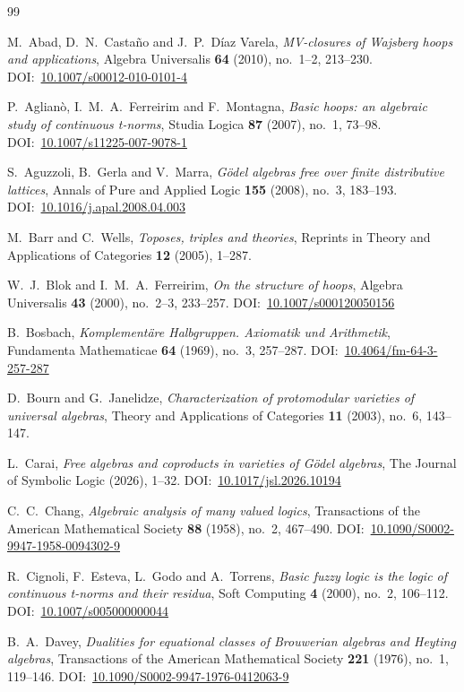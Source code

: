 \documentclass[reqno,a4paper]{amsart}
\renewcommand{\doi}[1]{DOI:~\href{https://doi.org/#1}{#1}}
\theoremstyle{plain}
\theoremstyle{definition}
\theoremstyle{remark}
\numberwithin{equation}{section}
\begin{document}
\begin{thebibliography}{99}

M.~Abad, D.~N.~Castaño and J.~P.~Díaz Varela, \emph{MV-closures of Wajsberg hoops and applications}, Algebra Universalis \textbf{64} (2010), no.~1--2, 213--230. \doi{10.1007/s00012-010-0101-4}

P.~Aglianò, I.~M.~A.~Ferreirim and F.~Montagna, \emph{Basic hoops: an algebraic study of continuous t-norms}, Studia Logica \textbf{87} (2007), no.~1, 73--98. \doi{10.1007/s11225-007-9078-1}

S.~Aguzzoli, B.~Gerla and V.~Marra, \emph{G\"odel algebras free over finite distributive lattices}, Annals of Pure and Applied Logic \textbf{155} (2008), no.~3, 183--193. \doi{10.1016/j.apal.2008.04.003}

M.~Barr and C.~Wells, \emph{Toposes, triples and theories}, Reprints in Theory and Applications of Categories \textbf{12} (2005), 1--287.

W.~J.~Blok and I.~M.~A.~Ferreirim, \emph{On the structure of hoops}, Algebra Universalis \textbf{43} (2000), no.~2--3, 233--257. \doi{10.1007/s000120050156}

B.~Bosbach, \emph{Komplementäre Halbgruppen. Axiomatik und Arithmetik}, Fundamenta Mathematicae \textbf{64} (1969), no.~3, 257--287. \doi{10.4064/fm-64-3-257-287}

D.~Bourn and G.~Janelidze, \emph{Characterization of protomodular varieties of universal algebras}, Theory and Applications of Categories \textbf{11} (2003), no.~6, 143--147.

L.~Carai, \emph{Free algebras and coproducts in varieties of G\"odel algebras}, The Journal of Symbolic Logic (2026), 1--32. \doi{10.1017/jsl.2026.10194}

C.~C.~Chang, \emph{Algebraic analysis of many valued logics}, Transactions of the American Mathematical Society \textbf{88} (1958), no.~2, 467--490. \doi{10.1090/S0002-9947-1958-0094302-9}

R.~Cignoli, F.~Esteva, L.~Godo and A.~Torrens, \emph{Basic fuzzy logic is the logic of continuous t-norms and their residua}, Soft Computing \textbf{4} (2000), no.~2, 106--112. \doi{10.1007/s005000000044}

B.~A.~Davey, \emph{Dualities for equational classes of Brouwerian algebras and Heyting algebras}, Transactions of the American Mathematical Society \textbf{221} (1976), no.~1, 119--146. \doi{10.1090/S0002-9947-1976-0412063-9}


\end{thebibliography}
\end{document}
